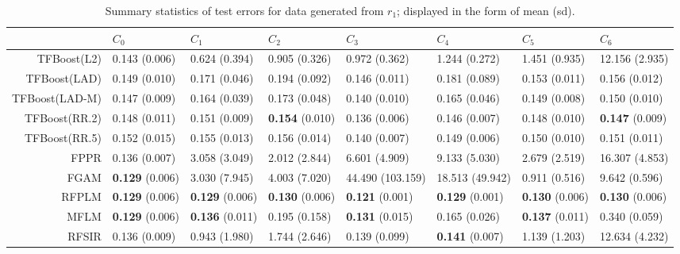 \begin{table}[H]
\centering
\begin{tabular}{rlllllll}
  \hline
 & $C_0$ & $C_1$ & $C_2$ & $C_3$ & $C_4$ & $C_5$ & $C_6$ \\ 
  \hline
TFBoost(L2) & 0.143 (0.006) & 0.624 (0.394) & 0.905 (0.326) & 0.972 (0.362) & 1.244 (0.272) & 1.451 (0.935) & 12.156 (2.935) \\ 
  TFBoost(LAD) & 0.149 (0.010) & 0.171 (0.046) & 0.194 (0.092) & 0.146 (0.011) & 0.181 (0.089) & 0.153 (0.011) & 0.156 (0.012) \\ 
  TFBoost(LAD-M) & 0.147 (0.009) & 0.164 (0.039) & 0.173 (0.048) & 0.140 (0.010) & 0.165 (0.046) & 0.149 (0.008) & 0.150 (0.010) \\ 
  TFBoost(RR.2) & 0.148 (0.011) & 0.151 (0.009) & \textbf{0.154} (0.010) & 0.136 (0.006) & 0.146 (0.007) & 0.148 (0.010) & \textbf{0.147} (0.009) \\ 
  TFBoost(RR.5) & 0.152 (0.015) & 0.155 (0.013) & 0.156 (0.014) & 0.140 (0.007) & 0.149 (0.006) & 0.150 (0.010) & 0.151 (0.011) \\ 
  FPPR & 0.136 (0.007) & 3.058 (3.049) & 2.012 (2.844) & 6.601 (4.909) & 9.133 (5.030) & 2.679 (2.519) & 16.307 (4.853) \\ 
  FGAM & \textbf{0.129} (0.006) & 3.030 (7.945) & 4.003 (7.020) & 44.490 (103.159) & 18.513 (49.942) & 0.911 (0.516) & 9.642 (0.596) \\ 
  RFPLM & \textbf{0.129} (0.006) & \textbf{0.129} (0.006) & \textbf{0.130} (0.006) & \textbf{0.121} (0.001) & \textbf{0.129} (0.001) & \textbf{0.130} (0.006) & \textbf{0.130} (0.006) \\ 
  MFLM & \textbf{0.129} (0.006) & \textbf{0.136} (0.011) & 0.195 (0.158) & \textbf{0.131} (0.015) & 0.165 (0.026) & \textbf{0.137} (0.011) & 0.340 (0.059) \\ 
  RFSIR & 0.136 (0.009) & 0.943 (1.980) & 1.744 (2.646) & 0.139 (0.099) & \textbf{0.141} (0.007) & 1.139 (1.203) & 12.634 (4.232) \\ 
   \hline
\end{tabular}
\caption{Summary statistics of test errors for data generated from $r_1$; displayed in the form of mean (sd).} 
\end{table}
